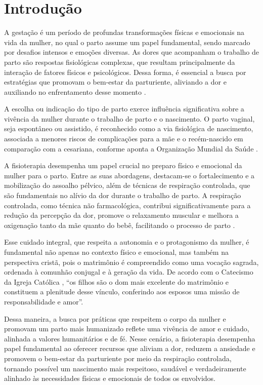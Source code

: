 \documentclass[openright]{normas-utf-tex}
\begin{document}
\listadefiguras
\listadetabelas

\sumario

\chapter{Introdução}
\label{chap:introducao}

A gestação é um período de profundas transformações físicas e emocionais na vida da mulher, no qual o parto assume um papel fundamental, sendo marcado por desafios intensos e emoções diversas. As dores que acompanham o trabalho de parto são respostas fisiológicas complexas, que resultam principalmente da interação de fatores físicos e psicológicos. Dessa forma, é essencial a busca por estratégias que promovam o bem-estar da parturiente, aliviando a dor e auxiliando no enfrentamento desse momento \cite[p.~54]{almeida2005}.

A escolha ou indicação do tipo de parto exerce influência significativa sobre a vivência da mulher durante o trabalho de parto e o nascimento. O parto vaginal, seja espontâneo ou assistido, é reconhecido como a via fisiológica de nascimento, associada a menores riscos de complicações para a mãe e o recém-nascido em comparação com a cesariana, conforme aponta a Organização Mundial da Saúde \cite{oms2018}.

A fisioterapia desempenha um papel crucial no preparo físico e emocional da mulher para o parto. Entre as suas abordagens, destacam-se o fortalecimento e a mobilização do assoalho pélvico, além de técnicas de respiração controlada, que são fundamentais no alívio da dor durante o trabalho de parto. A respiração controlada, como técnica não farmacológica, contribui significativamente para a redução da percepção da dor, promove o relaxamento muscular e melhora a oxigenação tanto da mãe quanto do bebê, facilitando o processo de parto \cite{cortes2015}.

Esse cuidado integral, que respeita a autonomia e o protagonismo da mulher, é fundamental não apenas no contexto físico e emocional, mas também na perspectiva cristã, pois o matrimônio é compreendido como uma vocação sagrada, ordenada à comunhão conjugal e à geração da vida. De acordo com o Catecismo da Igreja Católica \cite[p.~432]{catecismo2000}, ``os filhos são o dom mais excelente do matrimônio e constituem a plenitude desse vínculo, conferindo aos esposos uma missão de responsabilidade e amor''.

Dessa maneira, a busca por práticas que respeitem o corpo da mulher e promovam um parto mais humanizado reflete uma vivência de amor e cuidado, alinhada a valores humanitários e de fé. Nesse cenário, a fisioterapia desempenha papel fundamental ao oferecer recursos que aliviam a dor, reduzem a ansiedade e promovem o bem-estar da parturiente por meio da respiração controlada, tornando possível um nascimento mais respeitoso, saudável e verdadeiramente alinhado às necessidades físicas e emocionais de todos os envolvidos.
\end{document}
